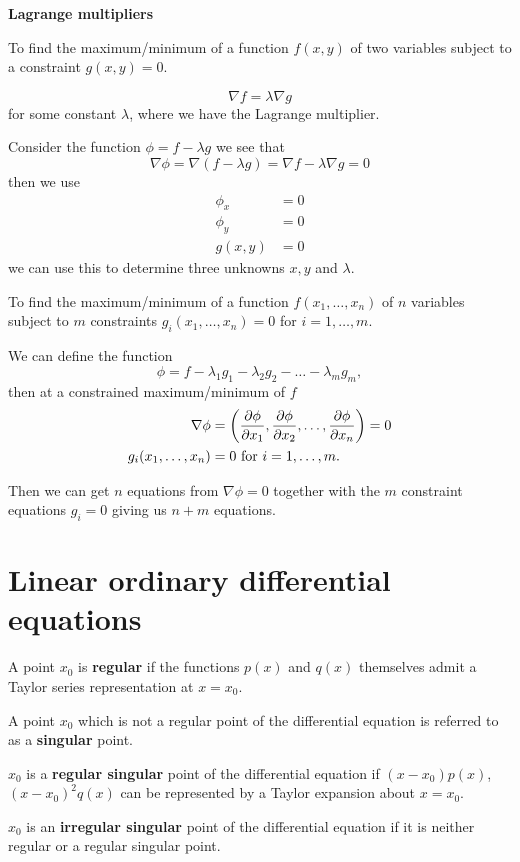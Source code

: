 \documentclass[10pt, a4paper]{article}
\begin{document}
\textbf{Lagrange multipliers}

To find the maximum/minimum of a function $f(x, y)$ of two variables subject to a constraint $g(x, y) = 0$.

\[
\nabla f = \lambda\nabla g
\]
for some constant $\lambda$,
where we have the Lagrange multiplier.

Consider the function $\phi = f - \lambda g$ we see that
\[
\nabla \phi = \nabla(f - \lambda g) = \nabla f - \lambda\nabla g = 0
\]
then we use
\begin{align*}
    \phi_x &= 0 \\
    \phi_y &= 0 \\
    g(x, y) &= 0
\end{align*}
we can use this to determine three unknowns $x, y$ and $\lambda$.

To find the maximum/minimum of a function $f(x_1, \dotsc, x_n)$ of $n$ variables subject to $m$ constraints $g_i(x_1, \dotsc, x_n) = 0$ for $i = 1, \dotsc, m$.

We can define the function
\[
\phi = f - \lambda_1g_1 - \lambda_2g_2 - \dotsc - \lambda_mg_m,
\]
then at a constrained maximum/minimum of $f$
\begin{align*}
    \nabla \phi &= \left(\pd[\phi]{x_1}, \pd[\phi]{x_2}, \dotsc, \pd[\phi]{x_n}\right) = 0 \\
    g_i(x_1, \dotsc, x_n) &= 0\text{ for }i = 1, \dotsc, m.
\end{align*}

Then we can get $n$ equations from $\nabla \phi = 0$ together with the $m$ constraint equations $g_i = 0$ giving us $n + m$ equations.

\newpage

\section{Linear ordinary differential equations}

A point $x_0$ is \textbf{regular} if the functions $p(x)$ and $q(x)$ themselves admit a Taylor series representation at $x = x_0$.


A point $x_0$ which is not a regular point of the differential equation is referred to as a \textbf{singular} point.


$x_0$ is a \textbf{regular singular} point of the differential equation if $(x - x_0)p(x)$,
$(x - x_0) ^ 2q(x)$ can be represented by a Taylor expansion about $x = x_0$.


$x_0$ is an \textbf{irregular singular} point of the differential equation if it is neither regular or a regular singular point.
\end{document}
